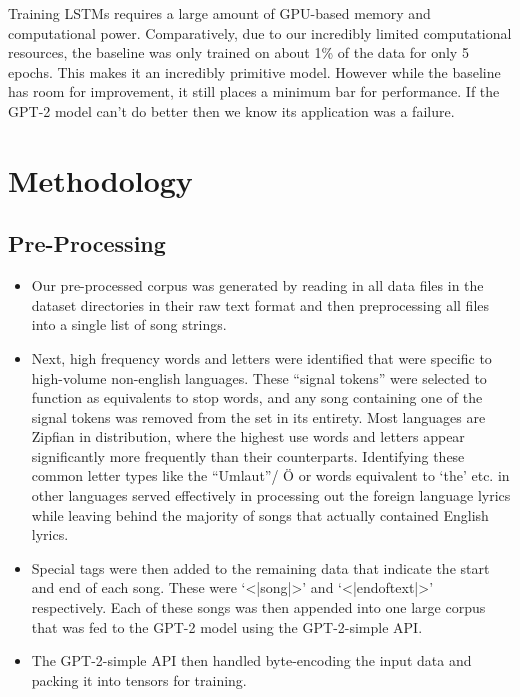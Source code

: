 \documentclass[11pt]{article}
\begin{document}
Training LSTMs requires a large amount of GPU-based memory and computational power. Comparatively, due to our incredibly limited computational resources, the baseline was only trained on about 1\% of the data for only 5 epochs. This makes it an incredibly primitive model. However while the baseline has room for improvement, it still places a minimum bar for performance. If the GPT-2 model can’t do better then we know its application was a failure.

\section{Methodology}

\subsection{Pre-Processing}

\begin{itemize}

\item Our pre-processed corpus was generated by reading in all data files in the dataset directories in their raw text format and then preprocessing all files into a single list of song strings.

\item Next, high frequency words and letters were identified that were specific to high-volume non-english languages. These “signal tokens” were selected to function as equivalents to stop words, and any song containing one of the signal tokens was removed from the set in its entirety. Most languages are Zipfian in distribution, where the highest use words and letters appear significantly more frequently than their counterparts. Identifying these common letter types like the “Umlaut”/ Ö or words equivalent to ‘the’ etc. in other languages served effectively in processing out the foreign language lyrics while leaving behind the majority of songs that actually contained English lyrics.

\item Special tags were then added to the remaining data that indicate the start and end of each song. These were ‘<|song|>’ and ‘<|endoftext|>’ respectively. Each of these songs was then appended into one large corpus that was fed to the GPT-2 model using the GPT-2-simple API.

\item The GPT-2-simple API then handled byte-encoding the input data and packing it into tensors for training.

\end{itemize}
\end{document}
